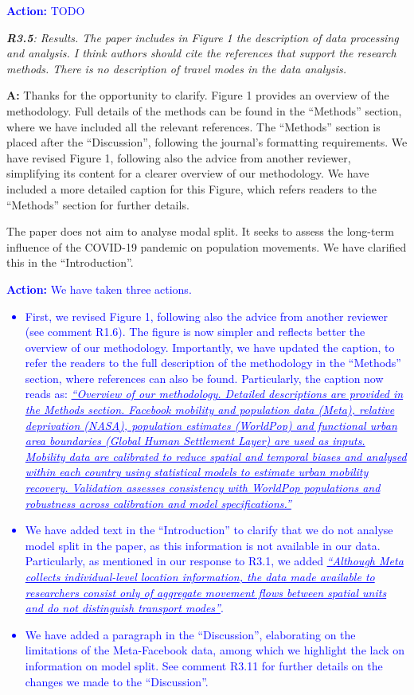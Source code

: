 \documentclass[12pt,a4paper,oneside, reqno]{amsart}
\begin{document}
\textcolor{blue}{\textbf{Action:} TODO}

\setlength{\leftskip}{0cm} \textit{\textbf{R3.5}: Results. The paper includes in Figure 1 the description of data processing and analysis. I think authors should cite the references that support the research methods. There is no description of travel modes in the data analysis. }

\setlength{\leftskip}{1cm}\textbf{A:} Thanks for the opportunity to clarify. Figure 1 provides an overview of the methodology. Full details of the methods can be found in the ``Methods'' section, where we have included all the relevant references. The ``Methods'' section is placed after the ``Discussion'', following the journal's formatting requirements. We have revised Figure 1, following also the advice from another reviewer, simplifying its content for a clearer overview of our methodology. We have included a more detailed caption for this Figure, which refers readers to the ``Methods'' section for further details.

The paper does not aim to analyse modal split. It seeks to assess the long-term influence of the COVID-19 pandemic on population movements. We have clarified this in the ``Introduction''.

\textcolor{blue}{
\textbf{Action:} We have taken three actions.
\begin{itemize}[noitemsep, topsep=0pt]
    \item First, we revised Figure 1, following also the advice from another reviewer (see comment R1.6). The figure is now simpler and reflects better the overview of our methodology. Importantly, we have updated the caption, to refer the readers to the full description of the methodology in the ``Methods'' section, where references can also be found. Particularly, the caption now reads as: \textit{\ul{``Overview of our methodology. Detailed descriptions are provided in the Methods section. Facebook mobility and population data (Meta), relative deprivation (NASA), population estimates (WorldPop) and functional urban area boundaries (Global Human Settlement Layer) are used as inputs. Mobility data are calibrated to reduce spatial and temporal biases and analysed within each country using statistical models to estimate urban mobility recovery. Validation assesses consistency with WorldPop populations and robustness across calibration and model specifications.''}}
    \item We have added text in the ``Introduction'' to clarify that we do not analyse model split in the paper, as this information is not available in our data. Particularly, as mentioned in our response to R3.1, we added \textit{\uline{``Although Meta collects individual-level location information, the data made available to researchers consist only of aggregate movement flows between spatial units and do not distinguish transport modes''}}.
    \item We have added a paragraph in the ``Discussion'', elaborating on the limitations of the Meta-Facebook data, among which we highlight the lack on information on model split. See comment R3.11 for further details on the changes we made to the ``Discussion''.
\end{itemize}
}
\end{document}
